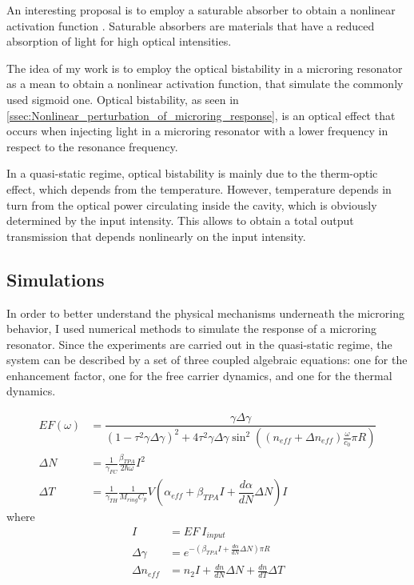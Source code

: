 An interesting proposal is to employ a saturable absorber to obtain a nonlinear activation function \cite{dejonckheere2014all}.
Saturable absorbers are materials that have a reduced absorption of light for high optical intensities.

The idea of my work is to employ the optical bistability in a microring resonator as a mean to obtain a nonlinear activation function, that simulate the commonly used sigmoid one.
Optical bistability, as seen in \autoref{ssec:Nonlinear_perturbation_of_microring_response}, is an optical effect that occurs when injecting light in a microring resonator with a lower frequency in respect to the resonance frequency.

In a quasi-static regime, optical bistability is mainly due to the therm-optic effect, which depends from the temperature.
However, temperature depends in turn from the optical power circulating inside the cavity, which is obviously determined by the input intensity.
This allows to obtain a total output transmission that depends nonlinearly on the input intensity.

\subsection{Simulations}
\label{ssec:Simulations}
In order to better understand the physical mechanisms underneath the microring behavior, I used numerical methods to simulate the response of a microring resonator.
Since the experiments are carried out in the quasi-static regime, the system can be described by a set of three coupled algebraic equations: one for the enhancement factor, one for the free carrier dynamics, and one for the thermal dynamics.

\begin{align}
EF \left( \omega \right)
	&= \dfrac	{ \gamma \Delta\gamma}
		{ \left( 1-\tau^2	\gamma \Delta\gamma \right)^2 + 4 \tau^2	\gamma \Delta\gamma \sin^2 \left( \left(n_{eff} + \Delta n_{eff}\right) \frac{\omega}{c_0} \pi R \right) }\\
\Delta N
	&= \frac{1}{\gamma_{FC}} \frac{\beta_{TPA}}{2\hbar \omega} I^2\\
\Delta T
	&= \frac{1}{\gamma_{TH}}\frac{1}{M_{ring}C_p} V\left(\alpha_{eff} + \beta_{TPA} I + \dfrac{d\alpha}{dN} \Delta N \right) I
\end{align}
where
\begin{align}
I 								&= EF~I_{input}\\
\Delta\gamma 		&= e^{-\left(\beta_{TPA} I + \frac{d\alpha}{dN} \Delta N \right) \pi R }\\
\Delta n_{eff} 	&= n_2 I + \frac{dn}{dN} \Delta N + \frac{dn}{dT} \Delta T
\end{align}

